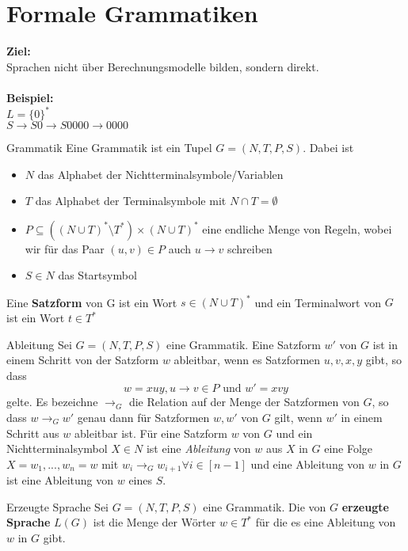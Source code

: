 
\section{Formale Grammatiken}

\textbf{Ziel:}\\
Sprachen nicht über Berechnungsmodelle bilden, sondern direkt.\\
\\
\textbf{Beispiel:}\\
$L = \{0\}^*$\\
$S \to S0 \to S0000 \to 0000$

\begin{defn}{Grammatik}
Eine Grammatik ist ein Tupel $G = (N, T, P, S)$. Dabei ist
\begin{itemize}
    \item $N$ das Alphabet der Nichtterminalsymbole/Variablen
    \item $T$ das Alphabet der Terminalsymbole mit $N \cap T = \emptyset$
    \item $P \subseteq ((N \cup T)^* \setminus T^*) \times (N \cup T)^*$ eine endliche Menge von Regeln, wobei wir für das Paar $(u, v) \in P$ auch $u \to v$ schreiben
    \item $S \in N$ das Startsymbol
\end{itemize}
Eine \textbf{Satzform} von G ist ein Wort $s \in (N \cup T)^*$ und ein Terminalwort von $G$ ist ein Wort $t \in T^*$
\end{defn}

\begin{defn}{Ableitung}
Sei $G = (N, T, P, S)$ eine Grammatik. Eine Satzform $w'$ von $G$ ist in einem Schritt von der Satzform $w$ ableitbar, wenn es Satzformen $u, v, x, y$ gibt, so dass
$$ w = xuy, u \to v \in P \text{ und } w' = xvy $$
gelte. Es bezeichne $\to_G$ die Relation auf der Menge der Satzformen von $G$, so dass $w \to_G w'$ genau dann für Satzformen $w, w'$ von $G$ gilt, wenn $w'$ in einem Schritt aus $w$ ableitbar ist.
Für eine Satzform $w$ von $G$ und ein Nichtterminalsymbol $X \in N$ ist eine \textit{Ableitung} von $w$ aus $X$ in $G$ eine Folge $X = w_1, ..., w_n = w$ mit $w_i \to_G w_{i+1} \forall i \in [n-1]$ und eine Ableitung von $w$ in $G$ ist eine Ableitung von $w$ eines $S$.
\end{defn}

\begin{defn}{Erzeugte Sprache}
Sei $G = (N, T, P, S)$ eine Grammatik. Die von $G$ \textbf{erzeugte Sprache} $L(G)$ ist die Menge der Wörter $w \in T^*$ für die es eine Ableitung von $w$ in $G$ gibt.
\end{defn}

